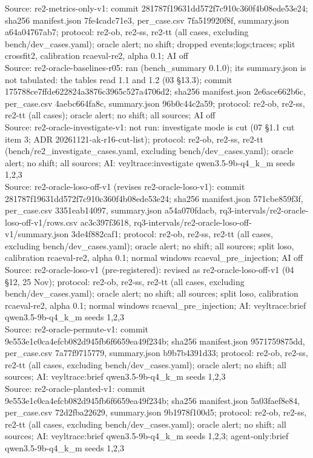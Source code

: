 \begin{table}[t]
Source: re2-metrics-only-v1: commit 281787f19631dd572f7c910c360f4b08ede53e24; sha256 manifest.json 7fe4cadc71e3, per\_case.csv 7fa519920f8f, summary.json a64a04767ab7; protocol: re2-ob, re2-ss, re2-tt (all cases, excluding bench/dev\_cases.yaml); oracle alert; no shift; dropped events;logs;traces; split crossfit2, calibration rcaeval-re2, alpha 0.1; AI off\\
Source: re2-oracle-baselines-r05: ran (bench\_summary 0.1.0); its summary.json is not tabulated: the tables read 1.1 and 1.2 (03 \S{}13.3); commit 175788ce7ffde622824a3876c3965c527a4706d2; sha256 manifest.json 2e6ace662b6c, per\_case.csv 4aebc664fa8c, summary.json 96b0c44c2a59; protocol: re2-ob, re2-ss, re2-tt (all cases); oracle alert; no shift; all sources; AI off\\
Source: re2-oracle-investigate-v1: not run: investigate mode is cut (07 \S{}1.1 cut item 3; ADR 20261121-ak-r16-cut-list); protocol: re2-ob, re2-ss, re2-tt (bench/re2\_investigate\_cases.yaml, excluding bench/dev\_cases.yaml); oracle alert; no shift; all sources; AI: veyltrace:investigate qwen3.5-9b-q4\_k\_m seeds 1,2,3\\
Source: re2-oracle-loso-off-v1 (revises re2-oracle-loso-v1): commit 281787f19631dd572f7c910c360f4b08ede53e24; sha256 manifest.json 571cbe859f3f, per\_case.csv 3351eab14097, summary.json a54a070fdacb, rq3-intervals/re2-oracle-loso-off-v1/rows.csv ac3c397f3618, rq3-intervals/re2-oracle-loso-off-v1/summary.json 3de4f882caf1; protocol: re2-ob, re2-ss, re2-tt (all cases, excluding bench/dev\_cases.yaml); oracle alert; no shift; all sources; split loso, calibration rcaeval-re2, alpha 0.1; normal windows rcaeval\_pre\_injection; AI off\\
Source: re2-oracle-loso-v1 (pre-registered): revised as re2-oracle-loso-off-v1 (04 \S{}12, 25 Nov); protocol: re2-ob, re2-ss, re2-tt (all cases, excluding bench/dev\_cases.yaml); oracle alert; no shift; all sources; split loso, calibration rcaeval-re2, alpha 0.1; normal windows rcaeval\_pre\_injection; AI: veyltrace:brief qwen3.5-9b-q4\_k\_m seeds 1,2,3\\
Source: re2-oracle-permute-v1: commit 9e553e1c0ca4efcb082d945fb6f6659ea49f234b; sha256 manifest.json 9571759875dd, per\_case.csv 7a77f9715779, summary.json b9b7b4391d33; protocol: re2-ob, re2-ss, re2-tt (all cases, excluding bench/dev\_cases.yaml); oracle alert; no shift; all sources; AI: veyltrace:brief qwen3.5-9b-q4\_k\_m seeds 1,2,3\\
Source: re2-oracle-planted-v1: commit 9e553e1c0ca4efcb082d945fb6f6659ea49f234b; sha256 manifest.json 5a03faef8e84, per\_case.csv 72d2fba22629, summary.json 9b1978f100d5; protocol: re2-ob, re2-ss, re2-tt (all cases, excluding bench/dev\_cases.yaml); oracle alert; no shift; all sources; AI: veyltrace:brief qwen3.5-9b-q4\_k\_m seeds 1,2,3; agent-only:brief qwen3.5-9b-q4\_k\_m seeds 1,2,3\\

\end{table}
